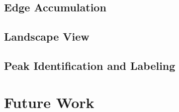 \documentclass[pdf,12pt,report,strict]{SANDreport}
\begin{document}
\section{Edge Accumulation}
\label{sec:EdgeAccumulation}

\section{Landscape View}
\label{sec:LandscapeView}

\section{Peak Identification and Labeling}
\label{sec:PeakIdentificationAndLabeling}


\chapter{Future Work}
\label{chap:FutureWork}








% 
\cleardoublepage
\providecommand*{\phantomsection}{}
\phantomsection
{}


\end{document}
